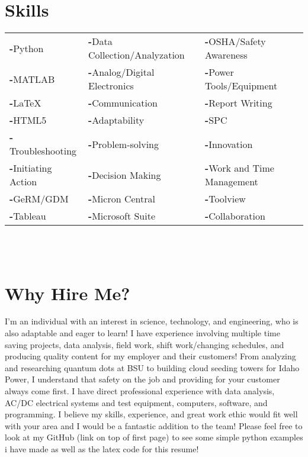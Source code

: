 \documentclass[a4paper,12pt]{article}
\begin{document}
\section{Skills}
    \begin{tabular}{|p{}|p{}|p{}}
         \textbf{-}Python & \textbf{-}Data Collection/Analyzation & \textbf{-}OSHA/Safety Awareness \\
         \textbf{-}MATLAB & \textbf{-}Analog/Digital Electronics & \textbf{-}Power Tools/Equipment \\
         \textbf{-}\LaTeX & \textbf{-}Communication & \textbf{-}Report Writing \\
         \textbf{-}HTML5 & \textbf{-}Adaptability & \textbf{-}SPC \\
         \textbf{-}Troubleshooting & \textbf{-}Problem-solving & \textbf{-}Innovation \\
         \textbf{-}Initiating Action & \textbf{-}Decision Making & \textbf{-}Work and Time Management \\
         \textbf{-}GeRM/GDM & \textbf{-}Micron Central & \textbf{-}Toolview \\
         \textbf{-}Tableau & \textbf{-}Microsoft Suite & \textbf{-}Collaboration \\
    \end{tabular}
\\
\\

\section{Why Hire Me?}
I'm an individual with an interest in science, technology, and engineering, who is also adaptable and eager to learn! I have experience involving multiple time saving projects, data analysis, field work, shift work/changing schedules, and producing quality content for my employer and their customers! From analyzing and researching quantum dots at BSU to building cloud seeding towers for Idaho Power, I understand that safety on the job and providing for your customer always come first. I have direct professional experience with data analysis, AC/DC electrical systems and test equipment, computers, software, and programming. I believe my skills, experience, and great work ethic would fit well with your area and I would be a fantastic addition to the team! Please feel free to look at my GitHub (link on top of first page) to see some simple python examples i have made as well as the latex code for this resume!
\end{document}
